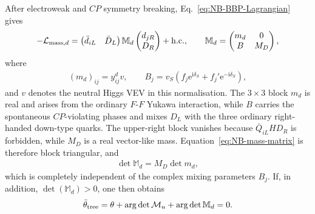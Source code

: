 \documentclass[review]{elsarticle}
\numberwithin{equation}{section}
\numberwithin{table}{section}
\numberwithin{figure}{section}
\def\i{\mathrm{i}}
\def\e{\mathrm{e}}
\def\M{\mathcal{M}}
\def\hc{{\rm h.c.}}
\begin{document}
After electroweak and $CP$ symmetry breaking, Eq.~\eqref{eq:NB-BBP-Lagrangian} gives
\begin{align}
    -\mathcal{L}_{{\rm mass},d}
    =
    \begin{pmatrix}
        \bar d_{iL} & \bar D_L
    \end{pmatrix}
    \mathbb{M}_d
    \begin{pmatrix}
        d_{jR}\\
        D_R
    \end{pmatrix}
    +\hc ,
    \qquad
    \mathbb{M}_d
    =
    \begin{pmatrix}
        m_d & 0\\
        B & M_D
    \end{pmatrix},
    \label{eq:NB-mass-matrix}
\end{align}
where
\begin{align}
    (m_d)_{ij} = y^d_{ij}v,
    \qquad
    B_j = v_S \left(f_j\e^{\i\delta_S}
    + f_j'\e^{-\i\delta_S} \right),
    \label{eq:NB-B-mixing}
\end{align}
and $v$ denotes the neutral Higgs VEV in this normalisation. The $3\times3$ block $m_d$ is real and arises from the ordinary $F$-$F$ Yukawa interaction, while $B$ carries the spontaneous $CP$-violating phases and mixes $D_L$ with the three ordinary right-handed down-type quarks. The upper-right block vanishes because $\bar Q_{iL}HD_R$ is forbidden, while $M_D$ is a real vector-like mass. Equation~\eqref{eq:NB-mass-matrix} is therefore block triangular, and
\begin{align}
    \det\mathbb{M}_d = M_D\det m_d,
    \label{eq:NB-real-determinant}
\end{align}
which is completely independent of the complex mixing parameters $B_j$. If, in addition, $\det(\mathbb{M}_d)>0$, one then obtains
\begin{align}
    \bar\theta_{\rm tree} = \theta + \arg\det\M_u + \arg\det\mathbb{M}_d = 0.
    \label{eq:NB-tree-theta}
\end{align}
\end{document}
